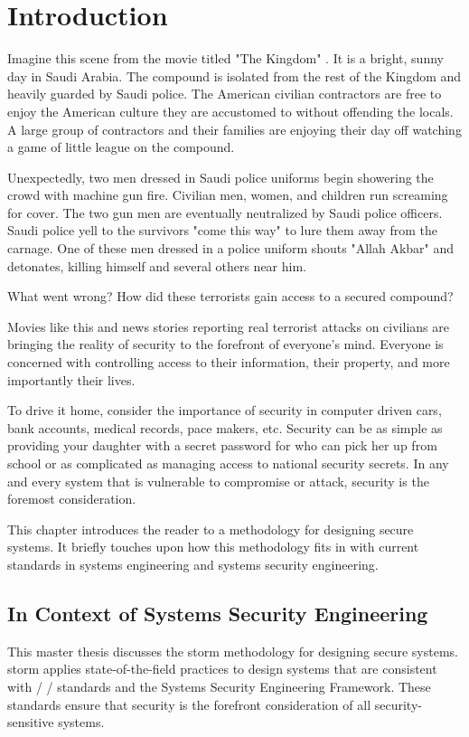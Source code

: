 \documentclass[../../main/main.tex]{subfiles}
\begin{document}
\glsresetall

\chapter{Introduction}
 Imagine this scene from the movie titled "The Kingdom" \cite{kingdom}.  It is a bright, sunny day in Saudi Arabia.  The compound is isolated from the rest of the Kingdom and heavily guarded by Saudi police.  The American civilian contractors are free to enjoy the American culture they are accustomed to without offending the locals.  A large group of contractors and their families are enjoying their day off watching a game of little league on the compound.  
 
 
Unexpectedly, two men dressed in Saudi police uniforms begin showering the crowd with machine gun fire.   Civilian men, women, and children run screaming for cover. The two gun men are eventually neutralized by Saudi police officers.  Saudi police yell to the survivors "come this way" to lure them away from the carnage. One of these men dressed in a police uniform shouts "Allah Akbar" and detonates, killing himself and several others near him. 

What went wrong?  How did these terrorists gain access to a secured compound?  

Movies like this and news stories reporting real terrorist attacks on civilians are bringing the reality of security to the forefront of everyone's mind.   Everyone is concerned with controlling access to their information, their property, and more importantly their lives.   

To drive it home, consider the importance of security in computer driven cars, bank accounts, medical records, pace makers, etc.  Security can be as simple as providing your daughter with a secret password for who can pick her up from school or as complicated as managing access to national security secrets.  In any and every system that is vulnerable to compromise or attack, security is the foremost consideration. 
 

This chapter introduces the reader to a methodology for designing secure systems.  It briefly touches upon how this methodology fits in with current standards in systems engineering and systems security engineering. 


\section{In Context of Systems Security Engineering}\label{sec:intro:motivation}
This master thesis discusses the \Gls{storm} methodology for designing secure systems.  \gls{storm} applies state-of-the-field practices to design systems that are consistent with / / standards and the  Systems Security Engineering Framework.  These standards ensure that security is the forefront  consideration of all security-sensitive systems.  
\end{document}
